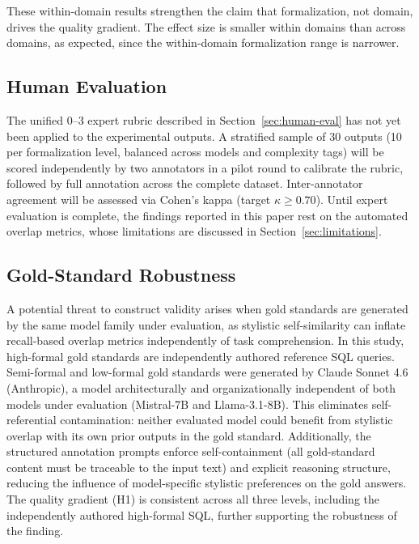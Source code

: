 \documentclass[runningheads]{llncs}
\begin{document}
These within-domain results strengthen the claim that formalization, not domain, drives the quality gradient. The effect size is smaller within domains than across domains, as expected, since the within-domain formalization range is narrower.

\subsection{Human Evaluation}
\label{sec:human-results}

The unified 0--3 expert rubric described in Section~\ref{sec:human-eval} has not yet been applied to the experimental outputs. A stratified sample of 30 outputs (10 per formalization level, balanced across models and complexity tags) will be scored independently by two annotators in a pilot round to calibrate the rubric, followed by full annotation across the complete dataset. Inter-annotator agreement will be assessed via Cohen's kappa (target $\kappa \geq 0.70$). Until expert evaluation is complete, the findings reported in this paper rest on the automated overlap metrics, whose limitations are discussed in Section~\ref{sec:limitations}.

\subsection{Gold-Standard Robustness}
\label{sec:gold-robustness}

A potential threat to construct validity arises when gold standards are generated by the same model family under evaluation, as stylistic self-similarity can inflate recall-based overlap metrics independently of task comprehension. In this study, high-formal gold standards are independently authored reference SQL queries. Semi-formal and low-formal gold standards were generated by Claude Sonnet 4.6 (Anthropic), a model architecturally and organizationally independent of both models under evaluation (Mistral-7B and Llama-3.1-8B). This eliminates self-referential contamination: neither evaluated model could benefit from stylistic overlap with its own prior outputs in the gold standard. Additionally, the structured annotation prompts enforce self-containment (all gold-standard content must be traceable to the input text) and explicit reasoning structure, reducing the influence of model-specific stylistic preferences on the gold answers. The quality gradient (H1) is consistent across all three levels, including the independently authored high-formal SQL, further supporting the robustness of the finding.
\end{document}
